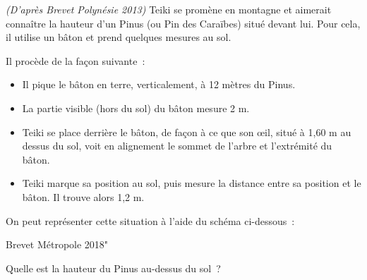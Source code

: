 
\textit{(D'après Brevet Polynésie 2013)}
\medskip
Teiki se promène en montagne et aimerait connaître la hauteur d'un Pinus (ou Pin des Caraïbes) situé devant lui. Pour cela, il utilise un bâton et prend quelques mesures au sol.
\par
Il procède de la façon suivante~:
\begin{itemize}
     \item Il pique le bâton en terre, verticalement, à 12 mètres du Pinus.
     \item La partie visible (hors du sol) du bâton mesure 2 m.
     \item Teiki se place derrière le bâton, de façon à ce que son œil, situé à 1,60 m au dessus du sol, voit en alignement le sommet de l'arbre et l'extrémité du bâton.
     \item Teiki marque sa position au sol, puis mesure la distance entre sa position et le bâton. Il trouve alors 1,2 m.
\end{itemize}
On peut représenter cette situation à l'aide du schéma ci-dessous~:
\begin{center}
     Brevet Métropole 2018"
\end{center}
Quelle est la hauteur du Pinus au-dessus du sol~?
%
